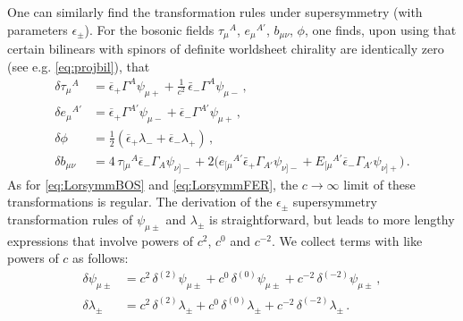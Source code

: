 \documentclass[a4paper,10pt,openany]{article}
\begin{document}
	One can similarly find the transformation rules under supersymmetry (with parameters $\epsilon_\pm$). For the bosonic fields $\tau_\mu{}^A$, $e_\mu{}^{A'}$, $b_{\mu\nu}$, $\phi$, one finds, upon using that certain bilinears with spinors of definite worldsheet chirality are identically zero (see e.g. \eqref{eq:projbil}), that
	\begin{subequations}\label{eq:bossusy}
		\begin{align}
			\delta \tau_\mu{}^A &=\overline{\epsilon}_{+}\Gamma^{A}\psi_{\mu +} + \frac{1}{c^2}\,\bar\epsilon_-\Gamma^A\psi_{\mu -}\,,\\
			\delta e_{\mu}{}^{A'} &= \overline{\epsilon}_{+}\Gamma^{A'}\psi_{\mu -}+\overline{\epsilon}_{-}\Gamma^{A'}\psi_{\mu +}\,,\\
			\delta \phi &=\frac{1}{2}(\overline{\epsilon}_{+}\lambda_{-}+\overline{\epsilon}_{-}\lambda_{+})\,,\\
			\delta b_{\mu\nu}&= 4\,\tau_{[\mu}{}^{A}\overline{\epsilon}_{-}\Gamma_{A}\psi_{\nu]-} + 2\Big(e_{[\mu}{}^{A'}\bar\epsilon_+\Gamma_{A'}\psi_{\nu]-}+E_{[\mu}{}^{A'}\overline{\epsilon}_{-}\Gamma_{A'}\psi_{\nu]+}\Big)\,.
		\end{align}
	\end{subequations}
	As for \eqref{eq:LorsymmBOS} and \eqref{eq:LorsymmFER}, the $c \rightarrow \infty$ limit of these transformations is regular. The derivation of the $\epsilon_\pm$ supersymmetry transformation rules of $\psi_{\mu\pm}$ and $\lambda_{\pm}$ is straightforward, but leads to more lengthy expressions that involve powers of $c^2$, $c^0$ and $c^{-2}$. We collect terms with like powers of $c$ as follows:%
	\begin{subequations}\label{eq:susyexpansion}
		\begin{align}
			\delta\psi_{\mu\pm} &= c^2\, \delta^{(2)}\psi_{\mu\pm} + c^0\,\delta^{(0)}\psi_{\mu\pm} + c^{-2}\,\delta^{(-2)}\psi_{\mu\pm}\,,\\
			\delta\lambda_{\pm} &= c^2\,\delta^{(2)}\lambda_{\pm} + c^0\,\delta^{(0)}\lambda_{\pm} + c^{-2}\,\delta^{(-2)}\lambda_{\pm}\,.
		\end{align}
	\end{subequations}
\end{document}
